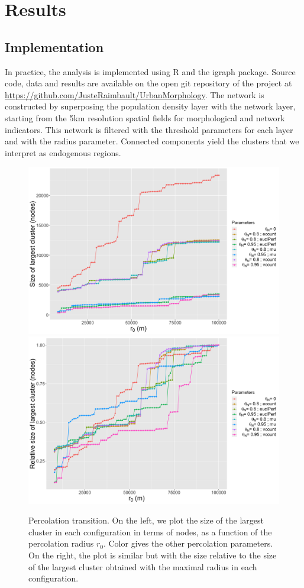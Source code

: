\documentclass{jimis-en}
\begin{document}
\section{Results}

\subsection{Implementation}


In practice, the analysis is implemented using R and the igraph package. Source code, data and results are available on the open git repository of the project at \url{https://github.com/JusteRaimbault/UrbanMorphology}. The network is constructed by superposing the population density layer with the network layer, starting from the 5km resolution spatial fields for morphological and network indicators. This network is filtered with the threshold parameters for each layer and with the radius parameter. Connected components yield the clusters that we interpret as endogenous regions.



\begin{figure}[ht] 
  {\includegraphics[width=0.49\linewidth]{figures/abssize_nodes.png}}
  {\includegraphics[width=0.49\linewidth]{figures/relsize_nodes.png}}
  \centering
  \caption{Percolation transition. On the left, we plot the size of the largest cluster in each configuration in terms of nodes, as a function of the percolation radius $r_0$. Color gives the other percolation parameters. On the right, the plot is similar but with the size relative to the size of the largest cluster obtained with the maximal radius in each configuration.\label{fig:percolation}}
\end{figure}
\end{document}
